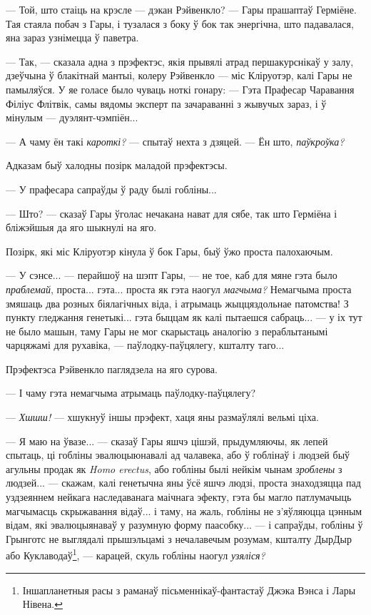 --- Той, што стаіць на крэсле --- дэкан Рэйвенкло? --- Гары прашаптаў
Герміёне. Тая стаяла  побач з Гары, і тузалася з боку ў бок так энергічна, што
падавалася, яна зараз узнімецца ў паветра. 

--- Так, --- сказала адна з прэфектэс, якія прывялі атрад першакурснікаў у залу,
дзеўчына ў блакітнай мантыі, колеру Рэйвенкло --- міс Кліруотэр,
калі Гары не памыляўся. У яе голасе было чуваць ноткі гонару:
--- Гэта Прафесар Чаравання Філіус Флітвік, самы вядомы эксперт па 
зачараванні з жывучых зараз, і ў мінулым --- дуэлянт-чэмпіён... 

--- А чаму ён такі \emph{кароткі?} --- спытаў нехта з дзяцей. --- Ён што,
\emph{паўкроўка?}

Адказам быў халодны позірк маладой прэфектэсы. 

--- У прафесара сапраўды ў раду былі гобліны...

--- Што? --- сказаў Гары ўголас нечакана нават для сябе, так што Герміёна і бліжэйшыя 
да яго шыкнулі на яго.

Позірк, які міс Кліруотэр кінула ў бок Гары, быў ўжо проста палохаючым. 

--- У сэнсе... --- перайшоў на шэпт Гары, --- не тое, каб для мяне гэта было
\emph{праблемай}, проста... гэта... проста як гэта наогул \emph{магчыма?} 
Немагчыма проста змяшаць два розных біялагічных віда, і атрымаць жыццяздольнае патомства! З пункту гледжання генетыкі... гэта быццам як калі пытаешся сабраць... ---
у іх тут не было машын, таму Гары не мог скарыстаць аналогію з пераблытанымі
чарцяжамі для рухавіка, --- паўлодку-паўцялегу, кшталту таго...

Прэфектэса Рэйвенкло паглядзела на яго сурова.

--- І чаму гэта немагчыма атрымаць паўлодку-паўцялегу?

--- \emph{Хшшш!} --- хшукнуў іншы прэфект, хаця яны размаўлялі вельмі ціха.

--- Я маю на ўвазе... --- сказаў Гары яшчэ цішэй, прыдумляючы, як лепей спытаць,
ці гобліны эвалюцыюнавалі ад чалавека, або ў гоблінаў і людзей быў агульны
продак як  \emph{Homo erectus}, або гобліны былі нейкім чынам \emph{зроблены}
з людзей... ---  скажам, калі генетычна яны ўсё яшчэ людзі, проста знаходзяцца 
пад уздзеяннем нейкага наследаванага маічнага эфекту, гэта бы магло 
патлумачыць магчымасць скрыжавання відаў... і таму, на жаль, гобліны не з'яўляюцца 
цэнным відам, які эвалюцыянаваў у разумную форму паасобку... ---
і сапраўды, гобліны ў Грынготс не выглядалі прышэльцамі з нечалавечым розумам, кшталту
ДырДыр або Куклаводаў\footnote{
    Іншапланетныя расы з раманаў пісьменнікаў-фантастаў Джэка 
    Вэнса і Лары Нівена.
}, --- карацей, скуль гобліны наогул \emph{узяліся?}

